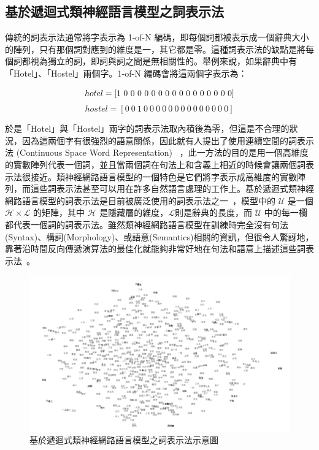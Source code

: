 \subsection{基於遞迴式類神經語言模型之詞表示法}
傳統的詞表示法通常將字表示為 1-of-N 編碼，即每個詞都被表示成一個辭典大小的陣列，只有那個詞對應到的維度是一，其它都是零。這種詞表示法的缺點是將每個詞都視為獨立的詞，即詞與詞之間是無相關性的。舉例來說，如果辭典中有「Hotel」、「Hostel」兩個字。1-of-N 編碼會將這兩個字表示為：

\[
   hotel = [1\ 0\ 0\ 0\ 0\ 0\ 0\ 0\ 0\ 0\ 0\ 0\ 0\ 0\ 0\ 0\ 0] \\ 
\]
\[
   hostel = [0\ 0\ 1\ 0\ 0\ 0\ 0\ 0\ 0\ 0\ 0\ 0\ 0\ 0\ 0\ 0\ 0]
\]

於是「Hotel」與「Hostel」兩字的詞表示法取內積後為零，但這是不合理的狀況，因為這兩個字有很強烈的語意關係，因此就有人提出了使用連續空間的詞表示法 (Continuous Space Word Representation)~\cite{collobert2008unified, turian2010word}
，此一方法的目的是用一個高維度的實數陣列代表一個詞，並且當兩個詞在句法上和含義上相近的時候會讓兩個詞表示法很接近。類神經網路語言模型的一個特色是它們將字表示成高維度的實數陣列，而這些詞表示法甚至可以用在許多自然語言處理的工作上。基於遞迴式類神經網路語言模型的詞表示法是目前被廣泛使用的詞表示法之一~\cite{mikolov2010recurrent}，模型中的 $\mathcal{U}$ 是一個 $\mathcal{H} \times \mathcal{L}$ 的矩陣，其中 $\mathcal{H}$ 是隱藏層的維度，$\mathcal{L}$則是辭典的長度，而 $\mathcal{U}$
中的每一欄都代表一個詞的詞表示法。雖然類神經網路語言模型在訓練時完全沒有句法(Syntax)、構詞(Morphology)、或語意(Semantics)相關的資訊，但很令人驚訝地，靠著沿時間反向傳遞演算法的最佳化就能夠非常好地在句法和語意上描述這些詞表示法~\cite{mikolov2013linguistic}。

\begin{figure}
\centering
\includegraphics[scale=0.15]{images/chap5_word_rep.png}
\caption{基於遞迴式類神經網路語言模型之詞表示法示意圖} \label{fig:chap5_word_rep}
\end{figure}

